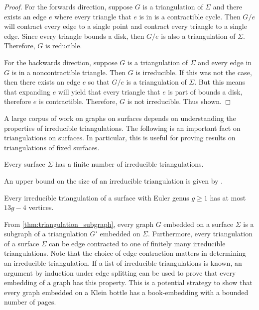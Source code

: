 \begin{proof}
    For the forwards direction, suppose $G$ is a triangulation of $\Sigma$ and there exists an edge $e$ where every triangle that $e$ is in is a contractible cycle. Then $G/ e$ will contract every edge to a single point and contract every triangle to a single edge. Since every triangle bounds a disk, then $G / e$ is also a triangulation of $\Sigma$. Therefore, $G$ is reducible. 

    For the backwards direction, suppose $G$ is a triangulation of $\Sigma$ and every edge in $G$ is in a noncontractible triangle. Then $G$ is irreducible. If this was not the case, then there exists an edge $e$ so that $G / e$ is a triangulation of $\Sigma$. But this means that expanding $e$ will yield that every triangle that $e$ is part of bounds a disk, therefore $e$ is contractible. Therefore, $G$ is not irreducible. Thus shown. 
\end{proof}

A large corpus of work on graphs on surfaces depends on understanding the properties of irreducible triangulations. The following is an important fact on triangulations on surfaces. In particular, this is useful for proving results on triangulations of fixed surfaces. 

\begin{theorem}
    Every surface $\Sigma$ has a finite number of irreducible triangulations.
\end{theorem}

An upper bound on the size of an irreducible triangulation is given by \textcite{joretIrreducibleTriangulationsAre2010}.

\begin{theorem}
    Every irreducible triangulation of a surface with Euler genus $g \geq 1$ has at most $13g - 4$ vertices. 
\end{theorem}

From \cref{thm:triangulation_subgraph}, every graph $G$ embedded on a surface $\Sigma$ is a subgraph of a triangulation $G'$ embedded on $\Sigma$. Furthermore, every triangulation of a surface $\Sigma$ can be edge contracted to one of finitely many irreducible triangulations. Note that the choice of edge contraction matters in determining an irreducible triangulation. If a list of irreducible triangulations is known, an argument by induction under edge splitting can be used to prove that every embedding of a graph has this property. This is a potential strategy to show that every graph embedded on a Klein bottle has a book-embedding with a bounded number of pages. 

